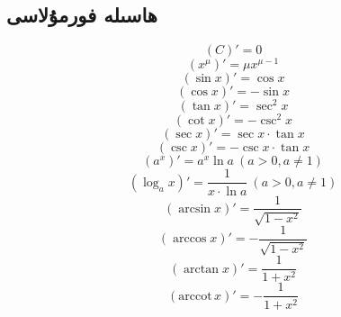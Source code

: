 \subsection{ھاسىلە فورمۇلاسى}
\begin{multicols}{3}
    \begin{equation*}
        \left( C\right)'=0
    \end{equation*}
    \begin{equation*}
        \left( x^{\mu}\right)'=\mu x^{\mu-1}
    \end{equation*}
    \begin{equation*}
        \left( \sin x\right)'=\cos x
    \end{equation*}
    \begin{equation*}
        \left( \cos x\right)'=-\sin x
    \end{equation*}
    \begin{equation*}
        \left( \tan x\right)'=\sec^2 x
    \end{equation*}
    \begin{equation*}
        \left( \cot x\right)'=-\csc^2 x
    \end{equation*}
    \begin{equation*}
        \left( \sec x\right)'=\sec x\cdot\tan x
    \end{equation*}
    \begin{equation*}
        \left( \csc x\right)'=-\csc x\cdot\tan x
    \end{equation*}
    \begin{equation*}
        \left( a^x\right)'=a^x\ln a\ (a>0,a\neq1)
    \end{equation*}
    \begin{equation*}
        \left( \log_{a}x\right)'=\frac{1}{x\cdot\ln a}\ (a>0,a\neq1)
    \end{equation*}
    \begin{equation*}
        \left( \arcsin x\right)'=\frac{1}{\sqrt{1-x^2}}
    \end{equation*}
    \begin{equation*}
        \left( \arccos x\right)'=-\frac{1}{\sqrt{1-x^2}}
    \end{equation*}
    \begin{equation*}
        \left( \arctan x\right)'=\frac{1}{1+x^2}
    \end{equation*}
    \begin{equation*}
        \left( \mathrm{arccot}\, x\right)'=-\frac{1}{1+x^2}
    \end{equation*}
\end{multicols}

